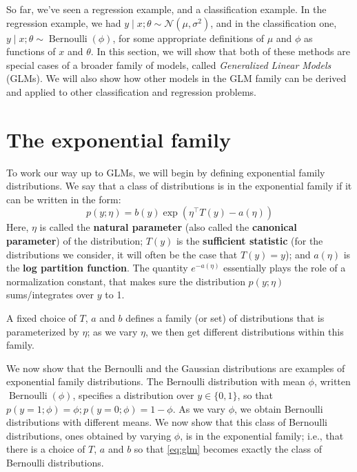 So far, we've seen a regression example, and a classification example. In the
regression example, we had $y \mid x; \theta \sim \mathcal{N}(\mu, \sigma^2)$, and in the classification one,
$y \mid x; \theta \sim \operatorname{Bernoulli}(\phi)$, for some appropriate definitions of $\mu$ and $\phi$ as functions
of $x$ and $\theta$. In this section, we will show that both of these methods are
special cases of a broader family of models, called \textit{Generalized Linear Models}
(GLMs). We will also show how other models in the GLM family can be
derived and applied to other classification and regression problems.

\section{The exponential family}
To work our way up to GLMs, we will begin by defining exponential family
distributions. We say that a class of distributions is in the exponential family
if it can be written in the form:
\[
p(y; \eta) = b(y)\exp(\eta^\top T(y) - a(\eta)) \label{eq:glm}
\]
Here, $\eta$ is called the \textbf{natural parameter} (also called the \textbf{canonical parameter})
of the distribution; $T(y)$ is the \textbf{sufficient statistic} (for the distributions
we consider, it will often be the case that $T(y) = y$); and $a(\eta)$ is the \textbf{log
partition function}. The quantity $e^{-a(\eta)}$ essentially plays the role of a normalization
constant, that makes sure the distribution $p(y;\eta)$ sums/integrates
over $y$ to 1.

A fixed choice of $T$, $a$ and $b$ defines a family (or set) of distributions that
is parameterized by $\eta$; as we vary $\eta$, we then get different distributions within
this family.

We now show that the Bernoulli and the Gaussian distributions are examples
of exponential family distributions. The Bernoulli distribution with
mean $\phi$, written $\operatorname{Bernoulli}(\phi)$, specifies a distribution over $y \in \{0,1\}$, so that
$p(y = 1;\phi) = \phi; p(y = 0;\phi) = 1 - \phi$. As we vary $\phi$, we obtain Bernoulli
distributions with different means. We now show that this class of Bernoulli
distributions, ones obtained by varying $\phi$, is in the exponential family; i.e.,
that there is a choice of $T$, $a$ and $b$ so that \ref{eq:glm} becomes exactly the
class of Bernoulli distributions.

